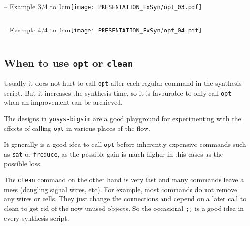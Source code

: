 \begin{frame}[t, fragile]{\subsecname{} -- Example 3/4}
\vbox to 0cm{\texttt{[image: PRESENTATION\_ExSyn/opt\_03.pdf]}\vss}
\vskip-1cm
\begin{columns}
\column[t]{5cm}

\column[t]{5cm}

\end{columns}
\end{frame}

\begin{frame}[t, fragile]{\subsecname{} -- Example 4/4}
\vbox to 0cm{\hskip6cm\texttt{[image: PRESENTATION\_ExSyn/opt\_04.pdf]}\vss}
\vskip-1cm
\begin{columns}
\column[t]{5cm}

\column[t]{5cm}

\end{columns}
\end{frame}


\subsection{When to use {\tt opt} or {\tt clean}}

\begin{frame}{\subsecname}
Usually it does not hurt to call {\tt opt} after each regular command in the
synthesis script. But it increases the synthesis time, so it is favourable
to only call {\tt opt} when an improvement can be archieved.

\bigskip
The designs in {\tt yosys-bigsim} are a good playground for experimenting with
the effects of calling {\tt opt} in various places of the flow.

\bigskip
It generally is a good idea to call {\tt opt} before inherently expensive
commands such as {\tt sat} or {\tt freduce}, as the possible gain is much
higher in this cases as the possible loss.

\bigskip
The {\tt clean} command on the other hand is very fast and many commands leave
a mess (dangling signal wires, etc). For example, most commands do not remove
any wires or cells. They just change the connections and depend on a later
call to clean to get rid of the now unused objects. So the occasional {\tt ;;}
is a good idea in every synthesis script.
\end{frame}


